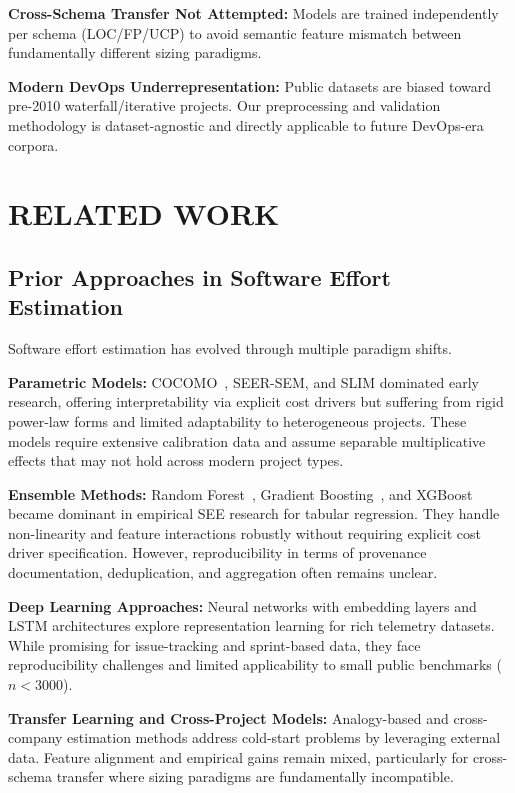 \documentclass[11pt,a4paper]{article}
\begin{document}
\textbf{Cross-Schema Transfer Not Attempted:} Models are trained independently per schema (LOC/FP/UCP) to avoid semantic feature mismatch between fundamentally different sizing paradigms.

\textbf{Modern DevOps Underrepresentation:} Public datasets are biased toward pre-2010 waterfall/iterative projects. Our preprocessing and validation methodology is dataset-agnostic and directly applicable to future DevOps-era corpora.

\newpage

\section{RELATED WORK}

\subsection{Prior Approaches in Software Effort Estimation}

Software effort estimation has evolved through multiple paradigm shifts.

\textbf{Parametric Models:} COCOMO~\cite{boehm2000cocomo}, SEER-SEM, and SLIM dominated early research, offering interpretability via explicit cost drivers but suffering from rigid power-law forms and limited adaptability to heterogeneous projects. These models require extensive calibration data and assume separable multiplicative effects that may not hold across modern project types.

\textbf{Ensemble Methods:} Random Forest~\cite{breiman2001random}, Gradient Boosting~\cite{friedman2001greedy}, and XGBoost~\cite{chen2016xgboost} became dominant in empirical SEE research for tabular regression. They handle non-linearity and feature interactions robustly without requiring explicit cost driver specification. However, reproducibility in terms of provenance documentation, deduplication, and aggregation often remains unclear.

\textbf{Deep Learning Approaches:} Neural networks with embedding layers and LSTM architectures explore representation learning for rich telemetry datasets. While promising for issue-tracking and sprint-based data, they face reproducibility challenges and limited applicability to small public benchmarks ($n < 3000$).

\textbf{Transfer Learning and Cross-Project Models:} Analogy-based and cross-company estimation methods address cold-start problems by leveraging external data. Feature alignment and empirical gains remain mixed, particularly for cross-schema transfer where sizing paradigms are fundamentally incompatible.
\end{document}
